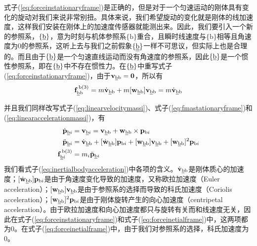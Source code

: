 \documentclass[12pt, a4paper, article, UTF8]{ctexart}
\begin{document}
式子(\ref{eq:forceinstationaryframe})是正确的，但是对于一个匀速运动的刚体具有变化的旋动对我们来说非常别扭。具体来说，我们希望旋动的变化就是刚体的线加速度，这样我们安装在刚体上的加速度传感器就能测出来。因此，我们要引入一个新的参照系，$\{\text{\underline{b}}\}$，意为时刻与机体参照系$\{\text{b}\}$重合，且瞬时线速度与$\{\text{b}\}$相等且角速度为0的参照系，这听上去与我们之前假象$\{\text{\underline{\underline{b}}}\}$一样不可思议，但实际上也是合理的。而且由于$\{\text{\underline{b}}\}$是一个匀速直线运动而没有角速度的参照系，因此$\{\text{\underline{b}}\}$是一个惯性参照系，即在$\{\text{\underline{b}}\}$中不存在惯性力。在$\{\text{\underline{b}}\}$中重写式子(\ref{eq:forceinstationaryframe})，由于$\mathbf{v}_{\text{\underline{b}b}}= \mathbf{0}$，所以有
\begin{align}
\mathbf{f}^{\,\text{b}(3)}_\text{\underline{b}b} = m \dot{\mathbf{v}}_{\text{\underline{b}b}} + m [\mathbf{w}_{\text{\underline{b}b}} ] \mathbf{v}_{\text{\underline{b}b}} = m \dot{\mathbf{v}}_{\text{\underline{b}b}} \label{eq:forceinetialframe}
\end{align}

并且我们同样改写式子(\ref{eq:linearvelocitymassi})、式子(\ref{eq:fmastationaryframe})和(\ref{eq:linearaccelerationmassi})，有
\begin{align}
\dot{\mathbf{p}}_{\text{\underline{b}}i} &= \mathbf{v}_{\text{\underline{b}}i} =\mathbf{v}_{\text{\underline{b}b}} + \mathbf{w}_{\text{\underline{b}b}} \times \mathbf{p}_{\text{b}i} \\
\ddot{\mathbf{p}}_{\text{\underline{b}}i} &= \dot{\mathbf{v}}_{\text{\underline{b}b}}  + [\dot{\mathbf{w}}_{\text{\underline{b}b}}] \mathbf{p}_{\text{b}i} + [\mathbf{w}_{\text{\underline{b}b}} ] \mathbf{v}_{\text{\underline{b}b}} + [\mathbf{w}_{\text{\underline{b}b}} ]^2 \mathbf{p}_{\text{b}i} \label{eq:inertialbodyacceleration} \\
\mathbf{f}^{\,\text{b}(3)}_{\text{\underline{b}}i} &= m_i \ddot{\mathbf{p}}_{\text{\underline{b}}i} \label{eq:inertialmasspointforce}
\end{align}
我们看式子(\ref{eq:inertialbodyacceleration})中各项的含义。$\dot{\mathbf{v}}_{\text{\underline{b}b}}$是刚体质心的加速度；$[\dot{\mathbf{w}}_{\text{\underline{b}b}}] \mathbf{p}_{\text{b}i}$是由于角速度变化导致的加速度，又称欧拉加速度（Euler acceleration）；$[\mathbf{w}_{\text{\underline{b}b}} ] \mathbf{v}_{\text{\underline{b}b}}$是由于参照系的选择而导致的科氏加速度（Coriolis acceleration）；$[\mathbf{w}_{\text{\underline{b}b}} ]^2 \mathbf{p}_{\text{b}i}$是由于刚体旋转产生的向心加速度（centripetal acceleration）。由于欧拉加速度和向心加速度都只与旋转有关而和线速度无关，因此在式子(\ref{eq:forceinstationaryframe})和式子(\ref{eq:forceinetialframe})中，这两项都为0。在式子(\ref{eq:forceinetialframe})中，由于我们对参照系的选择，科氏加速度为0。
\end{document}
